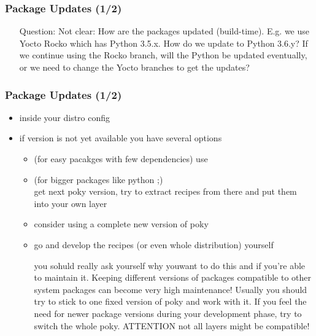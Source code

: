 \begin{frame}
\frametitle{Package Updates (1/2)}
   \begin{itemize}
      \item[Question:] Not clear: How are the packages updated (build-time). E.g. we use
        Yocto Rocko which has Python 3.5.x. How do we update to Python 3.6.y?
        If we continue using the Rocko branch, will the Python be updated
        eventually, or we need to change the Yocto branches to get the updates?
   \end{itemize}
\end{frame}

\begin{frame}
\frametitle{Package Updates (1/2)}
   \begin{itemize}
     \item inside your distro config 
     \item if version is not yet available you have several options
        \begin{itemize}
           \item (for easy pacakges with few dependencies) use
           \item (for bigger packages like python ;) \\
         		get next poky version, try to extract recipes from there and put them into your own layer
           \item consider using a complete new version of poky
           \item go and develop the recipes (or even whole distribution) yourself

   	you sohuld really ask yourself why youwant to do this and if you’re able to maintain it. Keeping different versions of packages compatible to other system packages can become very high maintenance!
   Usually you should try to stick to one fixed version of poky and work with it. If you feel the need for newer package versions during your development phase, try to switch the whole poky. ATTENTION not all layers might be compatible!
      \end{itemize}
   \end{itemize}
\end{frame}


